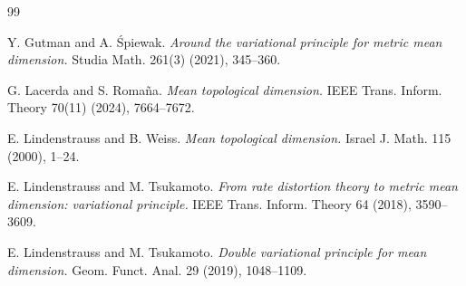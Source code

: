 \documentclass[11pt,a4paper,reqno]{amsart}
\theoremstyle{plain}
\theoremstyle{definition}
\begin{document}
\begin{thebibliography}{99}

Y. Gutman and A. \'Spiewak.
\newblock \emph{Around the variational principle for metric mean dimension.}
\newblock Studia Math. 261(3) (2021), 345--360.





G. Lacerda and S. Romaña.
\newblock \emph{Mean topological dimension.}
\newblock IEEE Trans. Inform. Theory 70(11) (2024), 7664--7672.



E. Lindenstrauss and B. Weiss.
\newblock \emph{Mean topological dimension.}
\newblock Israel J. Math. 115 (2000), 1--24.

E. Lindenstrauss and M. Tsukamoto.
\newblock \emph{From rate distortion theory to metric mean dimension: variational principle.}
\newblock IEEE Trans. Inform. Theory 64 (2018), 3590--3609.

E. Lindenstrauss and M. Tsukamoto.
\newblock \emph{Double variational principle for mean dimension.}
\newblock Geom. Funct. Anal. 29 (2019), 1048--1109.



\end{thebibliography}
\end{document}
